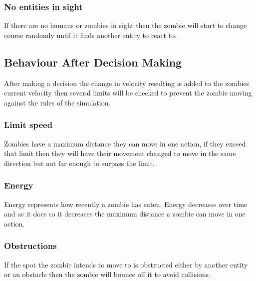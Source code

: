 \subsubsection{No entities in sight}
If there are no humans or zombies in sight then the zombie will start to change course randomly until it finds another entity to react to.

\subsection{Behaviour After Decision Making}
After making a decision the change in velocity resulting is added to the zombies current velocity then several limits will be checked to prevent the zombie moving against the rules of the simulation.

\subsubsection{Limit speed}
Zombies have a maximum distance they can move in one action, if they exceed that limit then they will have their movement changed to move in the same direction but not far enough to surpass the limit.

\subsubsection{Energy}
Energy represents how recently a zombie has eaten. Energy decreases over time and as it does so it decreases the maximum distance a zombie can move in one action.

\subsubsection{Obstructions}
If the spot the zombie intends to move to is obstructed either by another entity or an obstacle then the zombie will bounce off it to avoid collisions.
\clearpage
\endinput
